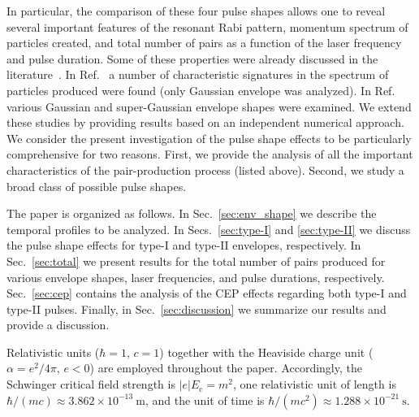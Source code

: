 \documentclass[preprint,aps,prd,showpacs,floatfix]{revtex4-1}
\begin{document}
\indent In particular, the comparison of these four pulse shapes allows one to reveal several important features of the resonant Rabi pattern, momentum spectrum of particles created, and total number of pairs as a function of the laser frequency and pulse duration. Some of these properties were already discussed in the literature~\cite{abdukerim_plb_2013, hebenstreit_prl_2009}. In Ref.~\cite{hebenstreit_prl_2009} a number of characteristic signatures in the spectrum of particles produced were found (only Gaussian envelope was analyzed). In Ref.~\cite{abdukerim_plb_2013} various Gaussian and super-Gaussian envelope shapes were examined. We extend these studies by
providing results based on an independent numerical approach. We consider the present investigation of the pulse shape effects to be particularly comprehensive for two reasons. First, we provide the analysis of all the important characteristics of the pair-production process (listed above). Second, we study a broad class of possible pulse shapes.

\indent The paper is organized as follows. In Sec.~\ref{sec:env_shape} we describe the temporal profiles to be analyzed. In Secs.~\ref{sec:type-I} and \ref{sec:type-II} we discuss the pulse shape effects for type-I and type-II envelopes, respectively. In Sec.~\ref{sec:total} we present results 
for the total number of pairs produced for various envelope shapes, laser frequencies, and pulse durations, respectively. Sec.~\ref{sec:cep} contains the analysis of the CEP effects regarding both type-I and type-II pulses. Finally, in Sec.~\ref{sec:discussion} we summarize our results and provide a discussion.

\indent Relativistic units ($\hbar = 1$, $c = 1$) together with the Heaviside charge unit ($\alpha = e^2/4\pi$, $e<0$) are employed throughout the paper. Accordingly, the Schwinger critical field strength is $|e| E_\text{c} = m^2$, one relativistic unit of length is $\hbar/(mc) \approx 3.862 \times 10^{-13}~\text{m}$, and the unit of time is $\hbar/(mc^2) \approx 1.288 \times 10^{-21}~\text{s}$.
%
\end{document}
